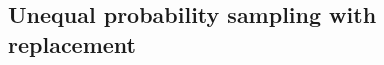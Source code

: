 \documentclass[10.5pt, letterpaper]{article}
\numberwithin{table}{section}
\numberwithin{figure}{section}
\numberwithin{equation}{section}
\newtheorem*{theorem2}{Theorem 2}
\begin{document}





\subsection{Unequal probability sampling with replacement}\label{sec:PPS}
\end{document}
